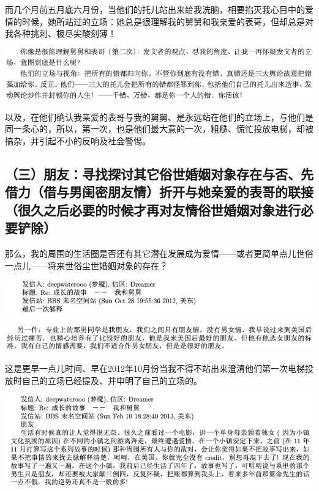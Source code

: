 \documentclass[9pt, b5paper]{article}
\begin{document}
而几个月前五月底六月份，当他们的托儿站出来给我洗脑，相要掐灭我心目中的爱情的时候，她所站过的立场：她总是很理解我的舅舅和我亲爱的表哥，但却总是对我各种挑刺、极尽尖酸刻薄！

\begin{center}
\includegraphics[width=.9\linewidth]{./pic/backups_plans_20210501_115141.png}
\end{center}

以及，在他们确认我亲爱的表哥与我的舅舅、是永远站在他们的立场上，与他们是同一条心的，所以，第一次，也是他们最大意的一次，粗糙、慌忙投放电梯，却被搞杂，并引起不小的反响及社会警惕。

\subsection{（三）朋友：寻找探讨其它俗世婚姻对象存在与否、先借力（借与男闺密朋友情）折开与她亲爱的表哥的联接（很久之后必要的时候才再对友情俗世婚姻对象进行必要铲除）}
\label{sec:org65d5484}

那么，我的周围的生活圈是否还有其它潜在发展成为爱情——或者更简单点儿世俗一点儿——将来世俗尘世婚姻对象的存在？

\begin{center}
\includegraphics[width=.9\linewidth]{./pic/backups_plans_20210501_093107.png}
\end{center}

\begin{center}
\includegraphics[width=.9\linewidth]{./pic/backups_plans_20210424_102654.png}
\end{center}

这是更早一点儿时间、早在2012年10月份当我不得不站出来澄清他们第一次电梯投放时自己的立场已经提及、并申明了自己的立场的。

\begin{center}
\includegraphics[width=.9\linewidth]{./pic/backups_plans_20210424_102814.png}
\end{center}
\end{document}
